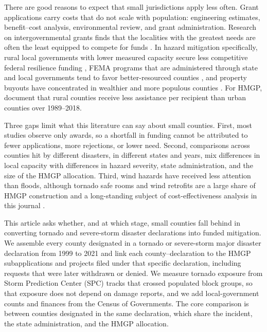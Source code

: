 \documentclass[12pt]{article}
\begin{document}
There are good reasons to expect that small jurisdictions apply less often. Grant applications carry costs that do not scale with population: engineering estimates, benefit--cost analysis, environmental review, and grant administration. Research on intergovernmental grants finds that the localities with the greatest needs are often the least equipped to compete for funds \parencite{collins2006redistributive,hall2008grant}. In hazard mitigation specifically, rural local governments with lower measured capacity secure less competitive federal resilience funding \parencite{smith2025rural}, FEMA programs that are administered through state and local governments tend to favor better-resourced counties \parencite{miao2025equity}, and property buyouts have concentrated in wealthier and more populous counties \parencite{mach2019buyouts}. For HMGP, \textcite{seong2022naturally} document that rural counties receive less assistance per recipient than urban counties over 1989--2018.

Three gaps limit what this literature can say about small counties. First, most studies observe only awards, so a shortfall in funding cannot be attributed to fewer applications, more rejections, or lower need. Second, comparisons across counties hit by different disasters, in different states and years, mix differences in local capacity with differences in hazard severity, state administration, and the size of the HMGP allocation. Third, wind hazards have received less attention than floods, although tornado safe rooms and wind retrofits are a large share of HMGP construction and a long-standing subject of cost-effectiveness analysis in this journal \parencite{simmons2006shelters}.

This article asks whether, and at which stage, small counties fall behind in converting tornado and severe-storm disaster declarations into funded mitigation. We assemble every county designated in a tornado or severe-storm major disaster declaration from 1999 to 2021 and link each county--declaration to the HMGP subapplications and projects filed under that specific declaration, including requests that were later withdrawn or denied. We measure tornado exposure from Storm Prediction Center (SPC) tracks that crossed populated block groups, so that exposure does not depend on damage reports, and we add local-government counts and finances from the Census of Governments. The core comparison is between counties designated in the same declaration, which share the incident, the state administration, and the HMGP allocation.
\end{document}
